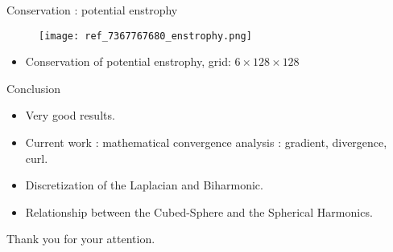 \documentclass[11pt]{beamer}
\begin{document}
\begin{frame}{Conservation : potential enstrophy}
\begin{figure}
\texttt{[image: ref\_7367767680\_enstrophy.png]}
\end{figure}
\begin{itemize}
\item Conservation of potential enstrophy, grid: $6 \times 128 \times 128$
\end{itemize}
\end{frame}


\begin{frame}{Conclusion}
\begin{itemize}
\item Very good results.
\item Current work : mathematical convergence analysis : gradient, divergence, curl.
\item Discretization of the Laplacian and Biharmonic.
\item Relationship between the Cubed-Sphere and the Spherical Harmonics.
\end{itemize}
\end{frame}


\begin{frame}
\begin{center}
Thank you for your attention.
\end{center}
\end{frame}
\end{document}

